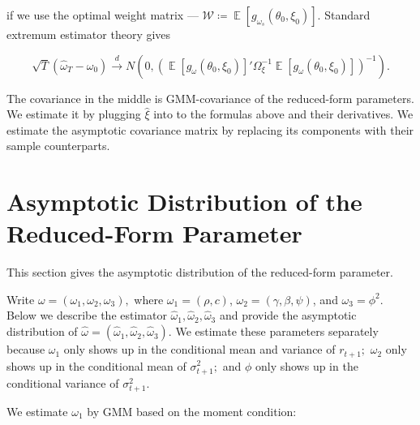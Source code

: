 \documentclass[11pt, letterpaper, twoside, final]{article}
\newcommand*{\dto}{\overset{d}{\longrightarrow}}
\newcommand*{\W}{\mathcal{W}}
\DeclareMathOperator*{\E}{\mathbb{E}}
\begin{document}
\noindent if we use the optimal weight matrix --- $\W \coloneqq \E[g_{\omega_s}(\theta_0, \xi_0)]$.
Standard extremum estimator theory gives

\begin{equation}
    \sqrt{T} \left(\widehat{\omega}_T - \omega_{0}\right)  \dto N\left(0, \left(\E[g_{\omega}(\theta_0, \xi_0)]'
    \Omega_{\xi}^{-1} \E[g_{\omega}(\theta_0, \xi_0)]\right)^{-1}\right).
\end{equation}

\noindent The covariance in the middle is GMM-covariance of the reduced-form parameters.
We estimate it by plugging $\widehat{\xi}$ into to the formulas above and their derivatives.
We estimate the asymptotic covariance matrix by replacing its components with their sample counterparts.


\section{Asymptotic Distribution of the Reduced-Form Parameter}

This section gives the asymptotic distribution of the reduced-form parameter. 

Write $\omega =(\omega_{1},\omega_{2},\omega_{3}),$ where $\omega_{1}=(\rho ,c)$, $\omega_{2} = (\gamma ,\beta ,\psi)$, and $\omega_{3} = \phi ^{2}$. 
Below we describe the estimator $\widehat{\omega}_{1},\widehat{\omega}_{2},\widehat{\omega}_{3}$ and provide
the asymptotic distribution of $\widehat{\omega} = (\widehat{\omega}_{1},\widehat{\omega
}_{2},\widehat{\omega}_{3})$.
We estimate these parameters separately because $\omega_{1}$ only shows up in the conditional mean and variance of
$r_{t+1};$ $\omega_{2}$ only shows up in the conditional mean of $\sigma_{t+1}^{2};$ and $\phi $ only shows up in
the conditional variance of $\sigma_{t+1}^{2}.$

We estimate $\omega_{1}$ by GMM based on the moment condition: 
\end{document}
